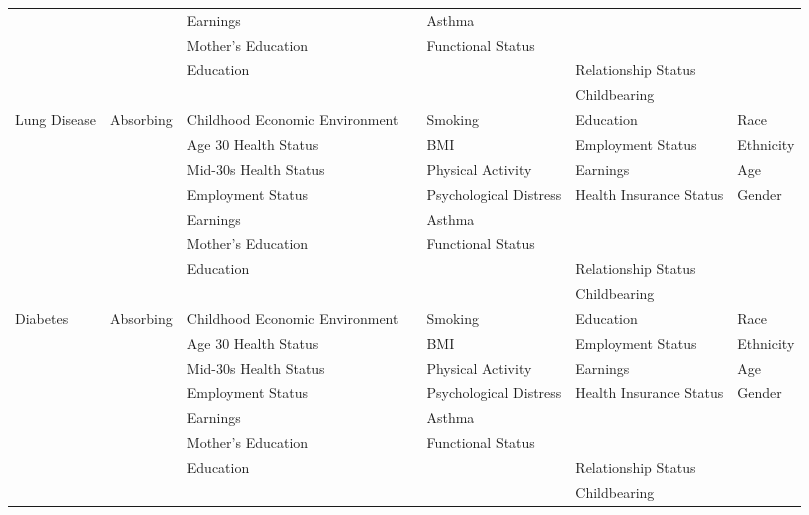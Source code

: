 \begin{table}
\begin{tiny}
\begin{tabular}{lllllll}
			&& Earnings  &  &  Asthma &  & \\
			&& Mother's Education &  & Functional Status &  & \\
			&& Education & &  & Relationship Status  & \\
			&& & & & Childbearing & \\
\midrule		
Lung Disease & Absorbing & Childhood Economic Environment &  & Smoking & Education & Race \\
			&& Age 30 Health Status &  & BMI & Employment Status & Ethnicity \\
			&& Mid-30s Health Status & & Physical Activity & Earnings & Age \\
			&& Employment Status &   &  Psychological Distress &  Health Insurance Status & Gender \\
			&& Earnings & & Asthma  & & \\
			&& Mother's Education &  & Functional Status  & & \\
			&& Education & & & Relationship Status  & \\
			&& & & & Childbearing & \\
\midrule		
Diabetes & Absorbing & Childhood Economic Environment & & Smoking & Education & Race \\
			&& Age 30 Health Status &  & BMI & Employment Status & Ethnicity \\
			&&  Mid-30s Health Status &  & Physical Activity & Earnings & Age \\
			&& Employment Status &   & Psychological Distress  & Health Insurance Status & Gender \\
			&&  Earnings & & Asthma  &  & \\
			&&  Mother's Education & & Functional Status &   & \\
			&& Education & &  & Relationship Status  & \\
			&& & & & Childbearing & \\
\midrule		


\end{tabular}
\end{tiny}
\end{table}
